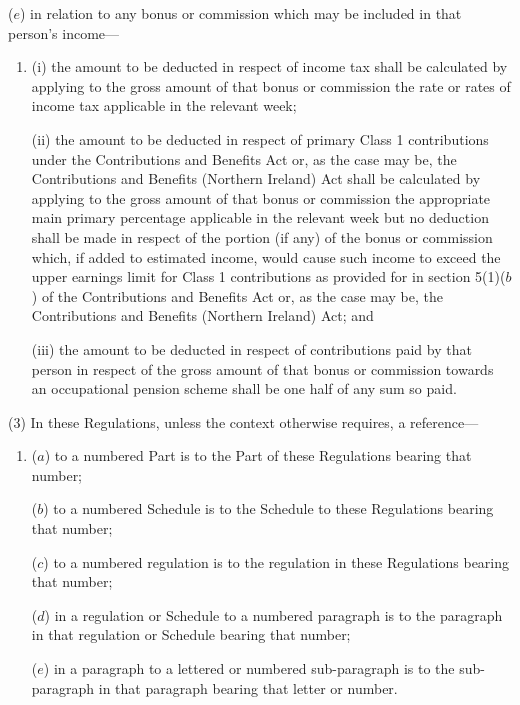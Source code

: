 \documentclass[12pt,a4paper]{article}
\begin{document}
\begin{enumerate}
($e$) in relation to any bonus or commission which may be included in that person’s income—
\begin{enumerate}\item[]
(i) the amount to be deducted in respect of income tax shall be calculated by applying to the gross amount of that bonus or commission the rate or rates of income tax applicable in the relevant week;

(ii) the amount to be deducted in respect of primary Class 1 contributions under the Contributions and Benefits Act 
or, as the case may be, the Contributions and Benefits (Northern Ireland) Act  %
shall be calculated by applying to the gross amount of that bonus or commission the appropriate main primary percentage applicable in the relevant week
but no deduction shall be made in respect of the portion (if any) of the bonus or commission which, if added to estimated income, would cause such income to exceed the upper earnings limit for Class 1 contributions as provided for in section 5(1)($b$) of the Contributions and Benefits Act %
or, as the case may be, the Contributions and Benefits (Northern Ireland) Act;  %
and

(iii) the amount to be deducted in respect of contributions paid by that person in respect of the gross amount of that bonus or commission towards an occupational pension scheme shall be one half of any sum so paid.
\end{enumerate}
\end{enumerate}

(3) In these Regulations, unless the context otherwise requires, a reference—
\begin{enumerate}\item[]
($a$) to a numbered Part is to the Part of these Regulations bearing that number;

($b$) to a numbered Schedule is to the Schedule to these Regulations bearing that number;

($c$) to a numbered regulation is to the regulation in these Regulations bearing that number;

($d$) in a regulation or Schedule to a numbered paragraph is to the paragraph in that regulation or Schedule bearing that number;

($e$) in a paragraph to a lettered or numbered sub-paragraph is to the sub-paragraph in that paragraph bearing that letter or number.
\end{enumerate}
\end{document}

